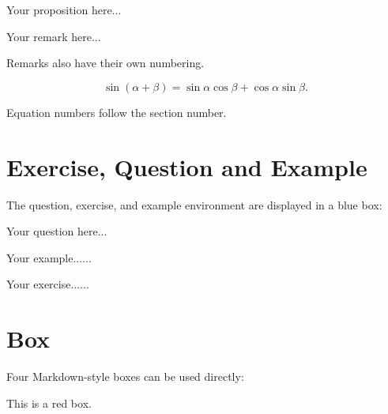 \documentclass[11pt,a4paper]{article}
\begin{document}
\begin{proposition}[A Proposition]
    Your proposition here...
\end{proposition}

\begin{remark}[A Remark]
    Your remark here...
\end{remark}

{\color{blue}Remarks also have their own numbering.}

\begin{equation}
    \sin(\alpha+\beta)=\sin \alpha \cos \beta + \cos \alpha \sin \beta.
\end{equation}

{\color{blue}Equation numbers follow the section number.}





\section{Exercise, Question and Example}


{\color{blue}The question, exercise, and example environment are displayed in a blue box:}

\begin{question}
    Your question here...
\end{question}

\begin{example}
	Your example......
	
	\experiment
	
	\take
	
	\intuition
\end{example}

\begin{exercise}
	Your exercise......
\end{exercise}




\section{Box}

{\color{blue} Four Markdown-style boxes can be used directly:}

\begin{redbox}
    This is a red box.
\end{redbox}
\end{document}
